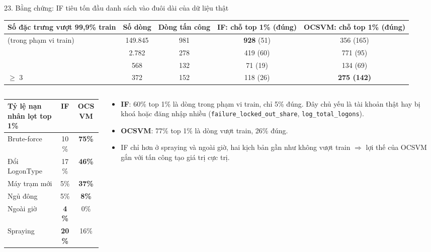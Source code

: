 \documentclass[aspectratio=169, 10pt]{beamer}
\begin{document}
\begin{frame}{23. Bằng chứng: IF tiêu tốn đầu danh sách vào đuôi dài của dữ liệu thật}
\footnotesize
\begin{tabularx}{\linewidth}{@{}>{\raggedright\arraybackslash}Xcc|cc@{}}
\toprule\rowcolor{socblue!10}\textbf{Số đặc trưng vượt 99,9\% train} & \textbf{Số dòng} & \textbf{Dòng tấn công} & \textbf{IF: chỗ top 1\% (đúng)} & \textbf{OCSVM: chỗ top 1\% (đúng)}\\\midrule
0 (trong phạm vi train) & 149.845 & 981 & \textcolor{socred}{\textbf{928}} (51) & 356 (165)\\
1 & 2.782 & 278 & 419 (60) & 771 (95)\\
2 & 568 & 132 & 71 (19) & 134 (69)\\
$\geq$ 3 & 372 & 152 & 118 (26) & \textbf{275 (142)}\\\bottomrule
\end{tabularx}
\par\vspace{.4em}
\begin{columns}[T,onlytextwidth]
\begin{column}{.5\textwidth}
\scriptsize
\begin{tabularx}{\linewidth}{@{}>{\raggedright\arraybackslash}Xcc@{}}
\toprule\rowcolor{socblue!10}\textbf{Tỷ lệ nạn nhân lọt top 1\%} & \textbf{IF} & \textbf{OCSVM}\\\midrule
Brute-force & 10\% & \textbf{75\%}\\
Đổi LogonType & 17\% & \textbf{46\%}\\
Máy trạm mới & 5\% & \textbf{37\%}\\
Ngủ đông & 5\% & \textbf{8\%}\\
Ngoài giờ & \textbf{4\%} & 0\%\\
Spraying & \textbf{20\%} & 16\%\\\bottomrule
\end{tabularx}
\end{column}
\begin{column}{.47\textwidth}
\begin{itemize}\setlength\itemsep{3pt}\scriptsize
\item \textbf{IF}: 60\% top 1\% là dòng trong phạm vi train, chỉ 5\% đúng. Đây chủ yếu là tài khoản thật hay bị khoá hoặc đăng nhập nhiều (\texttt{failure\_locked\_out\_share}, \texttt{log\_total\_logons}).
\item \textbf{OCSVM}: 77\% top 1\% là dòng vượt train, 26\% đúng.
\item IF chỉ hơn ở spraying và ngoài giờ, hai kịch bản gần như không vượt train $\Rightarrow$ lợi thế của OCSVM gắn với tấn công tạo giá trị cực trị.
\end{itemize}
\end{column}
\end{columns}
\end{frame}
\end{document}
